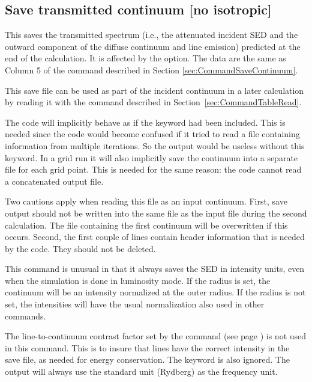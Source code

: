 \subsection{Save transmitted continuum [no isotropic]}
\label{sec:CommandSaveTransmittedContinuum}

This saves the transmitted spectrum (i.e., the attenuated incident SED and the outward component
of the diffuse continuum and line emission) predicted at the end of the calculation.
It is affected by the  option.
The data are the same as Column 5 of the 
command described in Section \ref{sec:CommandSaveContinuum}.

This save file can be used as part of the incident continuum in a later
calculation by reading it with the  command described in
Section~\ref{sec:CommandTableRead}.

The code will implicitly behave as if the keyword  had been
included. This is needed since the code would become confused if it tried to
read a file containing information from multiple iterations. So the output
would be useless without this keyword. In a grid run it will also implicitly
save the continuum into a separate file for each grid point. This is needed
for the same reason: the code cannot read a concatenated output file.

Two cautions apply when reading this file as an input continuum. First, save
output should not be written into the same file as the input file during the
second calculation. The file containing the first continuum will be
overwritten if this occurs. Second, the first couple of lines contain header
information that is needed by the code. They should not be deleted.

This command is unusual in that it always saves the SED in intensity units,
even when the simulation is done in luminosity mode. If the radius is set, the
continuum will be an intensity normalized at the outer radius. If the radius
is not set, the intensities will have the usual normalization also used in
other  commands.

The line-to-continuum contrast factor 
set by the  command
(see page \pageref{sec:CommandSetSaveLWidth})
is not used in this command.  This is to insure that lines have
the correct intensity in the save file, as needed for energy conservation.
The  keyword is also ignored. The output will always use
the standard unit (Rydberg) as the frequency unit.

